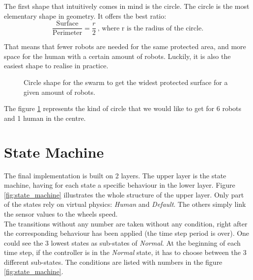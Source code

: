 \documentclass[a4paper, 12pt]{report}
\newcommand{\epuck}[3][0] %
{
	\draw [very thick, fill=white] (#2,#3) circle [radius=0.5];
	\draw [very thick, rotate around={#1:(#2,#3)}] (#2-0.25,#3-0.433) -- (#2,#3+0.45) -- (#2+0.25,#3-0.433);
}
\newcommand{\human}[3][0] %
{
	\draw [line width=1.5pt, rotate around={#1:(#2,#3)}] (#2,#3+1) -- (#2-0.866,#3-0.5) -- (#2+0.866,#3-0.5) -- cycle;
	\draw (#2,#3) node[scale=2, rotate around={#1:(#2,#3)}]{H};
}
\begin{document}
	The first shape that intuitively comes in mind is the circle. The circle is the most elementary shape in geometry. It offers the best ratio:
	$$\frac{\mbox{Surface}}{\mbox{Perimeter}} = \frac{r}{2}~\mbox{, where r is the radius of the circle.}$$
	
	That means that fewer robots are needed for the same protected area, and more space for the human with a certain amount of robots. Luckily, it is also the easiest shape to realise in practice.
	
	\begin{figure}[!h]\centering
	\caption{Circle shape for the swarm to get the widest protected surface for a given amount of robots.}
	\label{fig:circle_shape}
	\end{figure}
	
		The figure \ref{fig:circle_shape} represents the kind of circle that we would like to get for 6 robots and 1 human in the centre.
		
	\section{State Machine}
	
	The final implementation is built on 2 layers. The upper layer is the state machine, having for each state a specific behaviour in the lower layer. Figure \ref{fig:state_machine} illustrates the whole structure of the upper layer. Only part of the states rely on virtual physics: \emph{Human} and \emph{Default}. The others simply link the sensor values to the wheels speed.\\
	
	The transitions without any number are taken without any condition, right after the corresponding behaviour has been applied (the time step period is over). One could see the 3 lowest states as sub-states of \emph{Normal}. At the beginning of each time step, if the controller is in the \emph{Normal} state, it has to choose between the 3 different sub-states. The conditions are listed with numbers in the figure \ref{fig:state_machine}.
	
\end{document}
